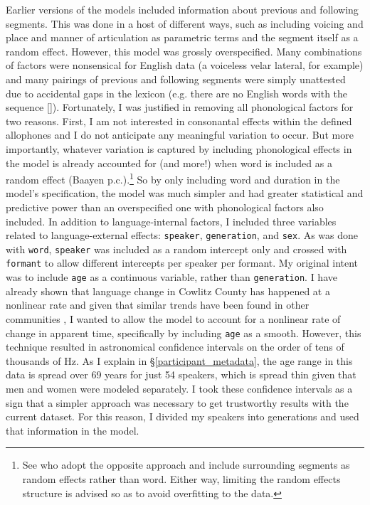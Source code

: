 Earlier versions of the models included information about previous and following segments. This was done in a host of different ways, such as including voicing and place and manner of articulation as parametric terms and the segment itself as a random effect. However, this model was grossly overspecified. Many combinations of factors were nonsensical for English data (a voiceless velar lateral, for example) and many pairings of previous and following segments were simply unattested due to accidental gaps in the lexicon (e.g. there are no English words with the sequence []). Fortunately, I was justified in removing all phonological factors for two reasons. First, I am not interested in consonantal effects within the defined allophones and I do not anticipate any meaningful variation to occur. But more importantly, whatever variation is captured by including phonological effects in the model is already accounted for (and more!) when word is included as a random effect (Baayen p.c.).\footnote{See \citet[47--48]{gahl_baayen_2019} who adopt the opposite approach and include surrounding segments as random effects rather than word. Either way, limiting the random effects structure is advised so as to avoid overfitting to the data.} So by only including word and duration in the model’s specification, the model was much simpler and had greater statistical and predictive power than an overspecified one with phonological factors also included.
In addition to language-internal factors, I included three variables related to language-external effects: \texttt{speaker}, \texttt{generation}, and \texttt{sex}. As was done with \texttt{word}, \texttt{speaker} was included as a random intercept only and crossed with \texttt{formant} to allow different intercepts per speaker per formant. My original intent was to include \texttt{age} as a continuous variable, rather than \texttt{generation}. I have already shown that language change in Cowlitz County has happened at a nonlinear rate \citep{stanley_2018_pwpl} and given that similar trends have been found in other communities \citep{fruehwald_2017}, I wanted to allow the model to account for a nonlinear rate of change in apparent time, specifically by including \texttt{age} as a smooth. However, this technique resulted in astronomical confidence intervals on the order of tens of thousands of Hz. As I explain in \S\ref{participant_metadata}, the age range in this data is spread over 69 years for just 54 speakers, which is spread thin given that men and women were modeled separately. I took these confidence intervals as a sign that a simpler approach was necessary to get trustworthy results with the current dataset. For this reason, I divided my speakers into generations and used that information in the model.

